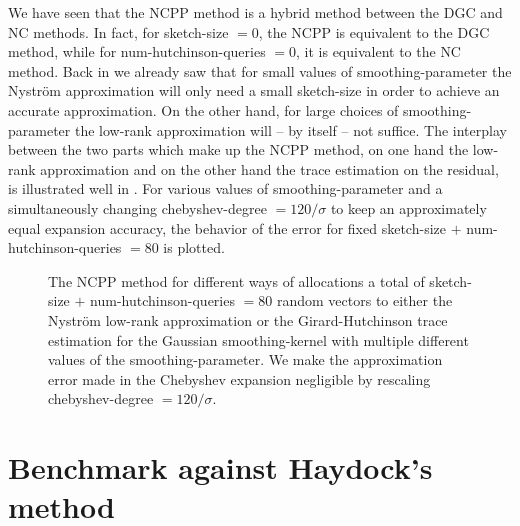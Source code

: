 We have seen that the \gls{NCPP} method is a hybrid method between the \gls{DGC} and \gls{NC} methods.
In fact, for \gls{sketch-size} $=0$, the \gls{NCPP} is equivalent to the \gls{DGC}
method, while for \gls{num-hutchinson-queries} $=0$, it is equivalent to the \gls{NC} method.
Back in  we already saw that for small values of \gls{smoothing-parameter}
the Nystr\"om approximation will only need a small \gls{sketch-size} in order
to achieve an accurate approximation. On the other hand, for large choices of
\gls{smoothing-parameter} the low-rank approximation will -- by itself -- not suffice.
The interplay between the two parts which make up the \gls{NCPP} method,
on one hand the low-rank approximation and on the other hand the
trace estimation on the residual, is illustrated well in
.
For various values of \gls{smoothing-parameter} and a simultaneously changing
\gls{chebyshev-degree} $=120 / \sigma$ to keep an approximately equal expansion
accuracy, the behavior of the error for fixed \gls{sketch-size} $+$ \gls{num-hutchinson-queries} $=80$ is plotted.

\begin{figure}[ht]
    \centering
    
    \caption{The \gls{NCPP} method for different ways of allocations a 
    total of \gls{sketch-size} $+$ \gls{num-hutchinson-queries} $=80$ random vectors
    to either the Nystr\"om low-rank approximation or the Girard-Hutchinson trace estimation
    for the Gaussian \gls{smoothing-kernel} with multiple different values of
    the \gls{smoothing-parameter}. We make the approximation error made in the
    Chebyshev expansion negligible by rescaling \gls{chebyshev-degree} $=120 / \sigma$.}
    \label{fig:5-experiments-electronic-structure-matvec-mixture}
\end{figure}


\clearpage
\section{Benchmark against Haydock's method}
\label{sec:5-experiments-haydock-method}

